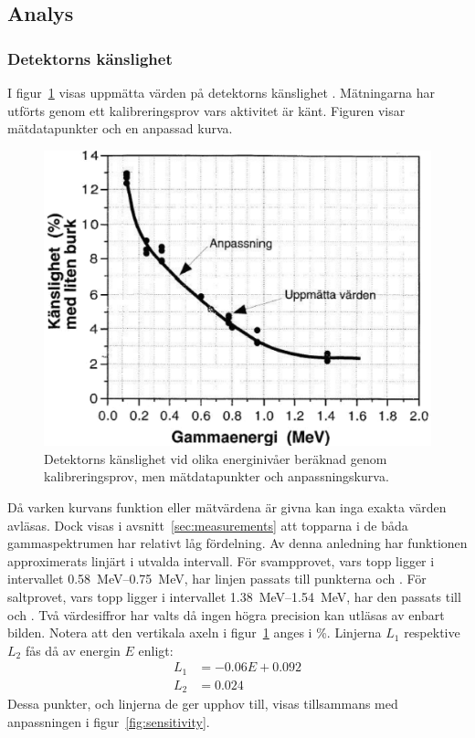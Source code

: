 \subsection{Analys} \label{sec:analysis}

\subsubsection{Detektorns känslighet} \label{sec:sensitivity}

I figur~\ref{fig:sensitivityraw} visas uppmätta värden på detektorns
känslighet \parencite{instructions}. Mätningarna har utförts genom ett
kalibreringsprov vars aktivitet är känt. Figuren visar mätdatapunkter
och en anpassad kurva.

\begin{figure}[!ht]
    \centering
    \includegraphics[width=\textwidth, keepaspectratio]{../images/sensitivity_raw.png}
    \caption{
        Detektorns känslighet vid olika energinivåer beräknad genom
        kalibreringsprov, men mätdatapunkter och anpassningskurva.
    }
    \label{fig:sensitivityraw}
\end{figure}

Då varken kurvans funktion eller mätvärdena är givna kan inga exakta värden
avläsas. Dock visas i avsnitt~\ref{sec:measurements} att topparna i de båda
gammaspektrumen har relativt låg fördelning. Av denna anledning har funktionen
approximerats linjärt i utvalda intervall. För svampprovet, vars topp ligger i
intervallet \qtyrange{0.58}{0.75}{\MeV}, har linjen passats till punkterna
 och . För saltprovet, vars topp ligger i
intervallet \qtyrange{1.38}{1.54}{\MeV}, har den passats till 
och . Två värdesiffror har valts då ingen högra precision kan
utläsas av enbart bilden. Notera att den vertikala axeln i
figur~\ref{fig:sensitivityraw} anges i \unit{\percent}. Linjerna $L_1$
respektive $L_2$ fås då av energin $E$ enligt:
%
\begin{align}
    L_1 &= \num{-0.06} E + \num{0.092} \label{eq:line1} \\
    L_2 &= \num{0.024}                 \label{eq:line2}
\end{align}
%
Dessa punkter, och linjerna de ger upphov till, visas tillsammans med
anpassningen i figur~\ref{fig:sensitivity}.

